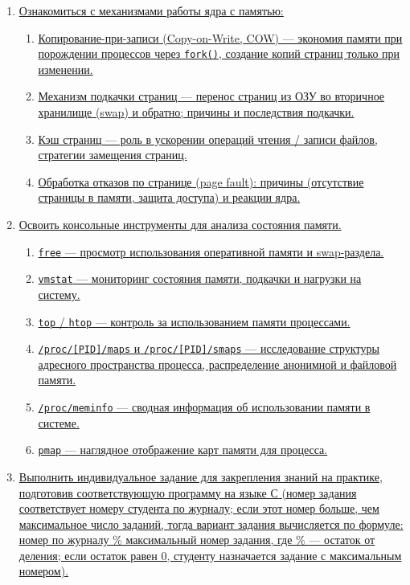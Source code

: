 \begin{enumerate}
    \item \hyperref[sec:6]{Ознакомиться с механизмами работы ядра с памятью:}
    \begin{enumerate}[label=\arabic{enumi}.\arabic*]
        \item \hyperref[sec:6.1]{Копирование-при-записи (Copy-on-Write, COW) — экономия памяти при порождении процессов через \texttt{fork()}, создание копий страниц только при изменении.}
        \item \hyperref[sec:6.2]{Механизм подкачки страниц — перенос страниц из ОЗУ во вторичное хранилище (swap) и обратно; причины и последствия подкачки.}
        \item \hyperref[sec:6.3]{Кэш страниц — роль в ускорении операций чтения / записи файлов, стратегии замещения страниц.}
        \item \hyperref[sec:6.4]{Обработка отказов по странице (page fault): причины (отсутствие страницы в памяти, защита доступа) и реакции ядра.}
    \end{enumerate}
    
    \item \hyperref[sec:7]{Освоить консольные инструменты для анализа состояния памяти.}
    \begin{enumerate}[label=\arabic{enumi}.\arabic*]
        \item \hyperref[sec:7.1]{\texttt{free} — просмотр использования оперативной памяти и swap-раздела.}
        \item \hyperref[sec:7.2]{\texttt{vmstat} — мониторинг состояния памяти, подкачки и нагрузки на систему.}
        \item \hyperref[sec:7.3]{\texttt{top} / \texttt{htop} — контроль за использованием памяти процессами.}
        \item \hyperref[sec:7.4]{\texttt{/proc/[PID]/maps} и \texttt{/proc/[PID]/smaps} — исследование структуры адресного пространства процесса, распределение анонимной и файловой памяти.}
        \item \hyperref[sec:7.5]{\texttt{/proc/meminfo} — сводная информация об использовании памяти в системе.}
        \item \hyperref[sec:7.6]{\texttt{pmap} — наглядное отображение карт памяти для процесса.}
    \end{enumerate}
    
    \item \hyperref[sec:8]{Выполнить индивидуальное задание для закрепления знаний на практике, подготовив соответствующую программу на языке С (номер задания соответствует номеру студента по журналу; если этот номер больше, чем максимальное число заданий, тогда вариант задания вычисляется по формуле: номер по журналу \% максимальный номер задания, где \% — остаток от деления; если остаток равен 0, студенту назначается задание с максимальным номером).}
\end{enumerate}